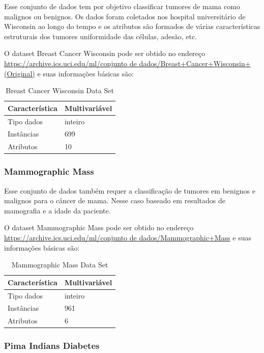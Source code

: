 \documentclass[12pt, a4paper]{article}
\begin{document}
Esse conjunto de dados tem por objetivo classificar tumores de mama como malignos ou benignos. Os dados foram coletados nos hospital universitário de Wisconsin ao longo do tempo e os atributos são formados de várias características estruturais dos tumores uniformidade das células, adesão, etc.

O dataset Breast Cancer Wisconsin pode ser obtido no endereço \url{https://archive.ics.uci.edu/ml/conjunto de dados/Breast+Cancer+Wisconsin+(Original)} e suas informações básicas são:
\begin{table}[!ht]
\centering
\caption{Breast Cancer Wisconsin Data Set}
\label{breasttable}
\begin{tabular}{|l|l|}
\hline
Característica & Multivariável\\
\hline
Tipo dados & inteiro \\
\hline
Instâncias & 699 \\
\hline
Atributos & 10\\
\hline
\end{tabular}
\end{table}

\subsubsection{Mammographic Mass}

Esse conjunto de dados também requer a classificação de tumores em benignos e malignos para o câncer de mama. Nesse caso baseado em resultados de mamografia e a idade da paciente.

O dataset Mammographic Mass pode ser obtido no endereço \url{https://archive.ics.uci.edu/ml/conjunto de dados/Mammographic+Mass} e suas informações básicas são:
\begin{table}[!ht]
\centering
\caption{Mammographic Mass Data Set}
\label{mammographictable}
\begin{tabular}{|l|l|}
\hline
Característica & Multivariável\\
\hline
Tipo dados & inteiro \\
\hline
Instâncias & 961 \\
\hline
Atributos & 6\\
\hline
\end{tabular}
\end{table}

\subsubsection{Pima Indians Diabetes}
\end{document}
